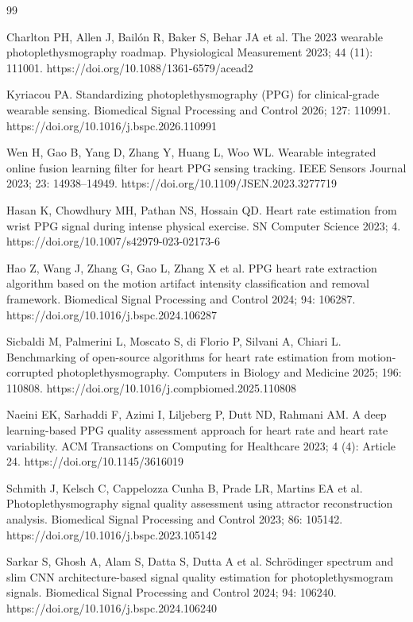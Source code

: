 \documentclass{elektr}
\begin{document}
\begin{thebibliography}{99}

Charlton PH, Allen J, Bail\'on R, Baker S, Behar JA et al. The 2023 wearable photoplethysmography roadmap. Physiological Measurement 2023; 44 (11): 111001. https://doi.org/10.1088/1361-6579/acead2

Kyriacou PA. Standardizing photoplethysmography (PPG) for clinical-grade wearable sensing. Biomedical Signal Processing and Control 2026; 127: 110991. https://doi.org/10.1016/j.bspc.2026.110991

Wen H, Gao B, Yang D, Zhang Y, Huang L, Woo WL. Wearable integrated online fusion learning filter for heart PPG sensing tracking. IEEE Sensors Journal 2023; 23: 14938--14949. https://doi.org/10.1109/JSEN.2023.3277719

Hasan K, Chowdhury MH, Pathan NS, Hossain QD. Heart rate estimation from wrist PPG signal during intense physical exercise. SN Computer Science 2023; 4. https://doi.org/10.1007/s42979-023-02173-6

Hao Z, Wang J, Zhang G, Gao L, Zhang X et al. PPG heart rate extraction algorithm based on the motion artifact intensity classification and removal framework. Biomedical Signal Processing and Control 2024; 94: 106287. https://doi.org/10.1016/j.bspc.2024.106287

Sicbaldi M, Palmerini L, Moscato S, di Florio P, Silvani A, Chiari L. Benchmarking of open-source algorithms for heart rate estimation from motion-corrupted photoplethysmography. Computers in Biology and Medicine 2025; 196: 110808. https://doi.org/10.1016/j.compbiomed.2025.110808

Naeini EK, Sarhaddi F, Azimi I, Liljeberg P, Dutt ND, Rahmani AM. A deep learning-based PPG quality assessment approach for heart rate and heart rate variability. ACM Transactions on Computing for Healthcare 2023; 4 (4): Article 24. https://doi.org/10.1145/3616019

Schmith J, Kelsch C, Cappelozza Cunha B, Prade LR, Martins EA et al. Photoplethysmography signal quality assessment using attractor reconstruction analysis. Biomedical Signal Processing and Control 2023; 86: 105142. https://doi.org/10.1016/j.bspc.2023.105142

Sarkar S, Ghosh A, Alam S, Datta S, Dutta A et al. Schr\"odinger spectrum and slim CNN architecture-based signal quality estimation for photoplethysmogram signals. Biomedical Signal Processing and Control 2024; 94: 106240. https://doi.org/10.1016/j.bspc.2024.106240


\end{thebibliography}
\end{document}
